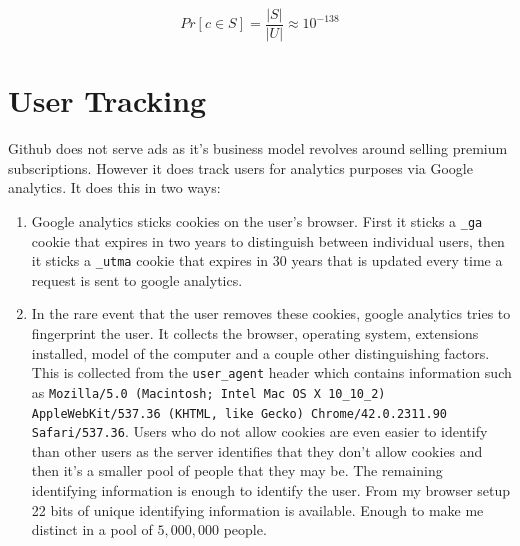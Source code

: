 \documentclass{lposter}
\theoremstyle{plain}
\theoremstyle{definition}
\renewcommand{\tt}[1]{\texttt{#1}}
\begin{document}
\begin{poster}
$$Pr[c \in S] = \frac{|S|}{|U|} \approx 10^{-138}$$



\section{User Tracking}
Github does not serve ads as it's business model revolves around selling premium subscriptions. However it does track users for analytics purposes via Google analytics. It does this in two ways:

\begin{enumerate}
\item Google analytics sticks cookies on the user's browser. First it sticks a \tt{\_ga} cookie that expires in two years to distinguish between individual users, then it sticks a \tt{\_utma} cookie that expires in 30 years that is updated every time a request is sent to google analytics. %
\item In the rare event that the user removes these cookies, google analytics tries to fingerprint the user. It collects the browser, operating system, extensions installed, model of the computer and a couple other distinguishing factors. This is collected from the \tt{user\_agent} header which contains information such as \tt{Mozilla/5.0 (Macintosh; Intel Mac OS X 10\_10\_2) AppleWebKit/537.36 (KHTML, like Gecko) Chrome/42.0.2311.90 Safari/537.36}. Users who do not allow cookies are even easier to identify than other users as the server identifies that they don't allow cookies and then it's a smaller pool of people that they may be. The remaining identifying information is enough to identify the user. From my browser setup 22 bits of unique identifying information is available. Enough to make me distinct in a pool of $5,000,000$ people.


\end{enumerate}
\end{poster}
\end{document}
